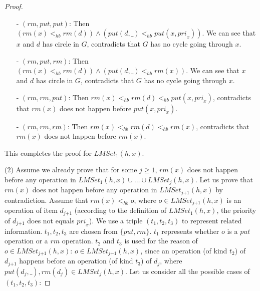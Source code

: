 \documentclass{llncs}
\begin{document}
\begin {proof}
\begin{itemize}
\item[-] $(\textit{rm},\textit{put},\textit{put})$: Then $( \textit{rm}(x) <_{hb} \textit{rm}(d) ) \wedge ( \textit{put}(d,\_) <_{hb} \textit{put}(x,\textit{pri}_x) )$. We can see that $x$ and $d$ has circle in $G$, contradicts that $G$ has no cycle going through $x$.

\item[-] $(\textit{rm},\textit{put},\textit{rm})$: Then $( \textit{rm}(x) <_{hb} \textit{rm}(d) ) \wedge ( \textit{put}(d,\_) <_{hb} \textit{rm}(x) )$. We can see that $x$ and $d$ has circle in $G$, contradicts that $G$ has no cycle going through $x$.

\item[-] $(\textit{rm},\textit{rm},\textit{put})$: Then $\textit{rm}(x) <_{hb} \textit{rm}(d) <_{hb} \textit{put}(x,\textit{pri}_x)$, contradicts that $\textit{rm}(x)$ does not happen before $\textit{put}(x,\textit{pri}_x)$.

\item[-] $(\textit{rm},\textit{rm},\textit{rm})$: Then $\textit{rm}(x) <_{hb} \textit{rm}(d) <_{hb} \textit{rm}(x)$, contradicts that $\textit{rm}(x)$ does not happen before $\textit{rm}(x)$.
\end{itemize}

This completes the proof for $\textit{LMSet}_1(h,x)$.

\noindent (2) Assume we already prove that for some $j \geq 1$, $\textit{rm}(x)$ does not happen before any operation in $\textit{LMSet}_1(h,x) \cup \ldots \cup \textit{LMSet}_j(h,x)$. Let us prove that $\textit{rm}(x)$ does not happen before any operation in $\textit{LMSet}_{\textit{j+1}}(h,x)$ by contradiction. Assume that $\textit{rm}(x) <_{hb} o$, where $o \in \textit{LMSet}_{\textit{j+1}}(h,x)$ is an operation of item $d_{\textit{j+1}}$ (according to the definition of $\textit{LMSet}_1(h,x)$, the priority of $d_{\textit{j+1}}$ does not equals $\textit{pri}_x$). We use a triple $(t_1,t_2,t_3)$ to represent related information. $t_1,t_2,t_3$ are chosen from $\{ \textit{put},\textit{rm} \}$. $t_1$ represents whether $o$ is a $\textit{put}$ operation or a $\textit{rm}$ operation. $t_2$ and $t_3$ is used for the reason of $o \in \textit{LMSet}_{\textit{j+1}}(h,x)$: $o \in \textit{LMSet}_{\textit{j+1}}(h,x)$, since an operation (of kind $t_2$) of $d_{\textit{j+1}}$ happens before an operation (of kind $t_3$) of $d_j$, where $\textit{put}(d_j,\_), \textit{rm}(d_j) \in \textit{LMSet}_j(h,x)$. Let us consider all the possible cases of $(t_1,t_2,t_3)$:


\end{proof}
\end{document}
